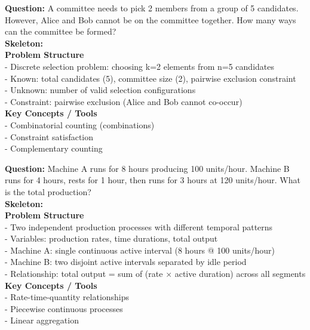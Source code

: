 \begin{tcolorbox}[
  colback=blue!3,
  colframe=blue!50!black,
  boxrule=0.5pt,
  arc=4pt,
  left=6pt,
  right=6pt,
  top=4pt,
  bottom=4pt,
  title=Few-shot Example 2: Combinatorics
]
\small
\textbf{Question:} A committee needs to pick 2 members from a group of 5 candidates. However, Alice and Bob cannot be on the committee together. How many ways can the committee be formed?\\[0.5em]

\textbf{Skeleton:}\\
\textbf{Problem Structure}\\
- Discrete selection problem: choosing k=2 elements from n=5 candidates\\
- Known: total candidates (5), committee size (2), pairwise exclusion constraint\\
- Unknown: number of valid selection configurations\\
- Constraint: pairwise exclusion (Alice and Bob cannot co-occur)\\[0.3em]
\textbf{Key Concepts / Tools}\\
- Combinatorial counting (combinations)\\
- Constraint satisfaction\\
- Complementary counting
\end{tcolorbox}

\begin{tcolorbox}[
  colback=blue!3,
  colframe=blue!50!black,
  boxrule=0.5pt,
  arc=4pt,
  left=6pt,
  right=6pt,
  top=4pt,
  bottom=4pt,
  title=Few-shot Example 3: Rate Problem
]
\small
\textbf{Question:} Machine A runs for 8 hours producing 100 units/hour. Machine B runs for 4 hours, rests for 1 hour, then runs for 3 hours at 120 units/hour. What is the total production?\\[0.5em]

\textbf{Skeleton:}\\
\textbf{Problem Structure}\\
- Two independent production processes with different temporal patterns\\
- Variables: production rates, time durations, total output\\
- Machine A: single continuous active interval (8 hours @ 100 units/hour)\\
- Machine B: two disjoint active intervals separated by idle period\\
- Relationship: total output = sum of (rate $\times$ active duration) across all segments\\[0.3em]
\textbf{Key Concepts / Tools}\\
- Rate-time-quantity relationships\\
- Piecewise continuous processes\\
- Linear aggregation
\end{tcolorbox}

